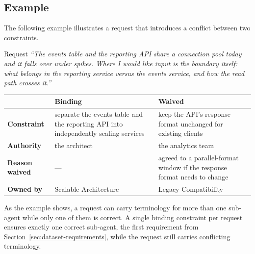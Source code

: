 \clearpage
\subsection{Example}
\label{subsec:constraints-example}

The following example illustrates a request that introduces a conflict between two constraints.

\begin{scenariobox}{Request}
\textit{``The events table and the reporting API share a connection pool today and it falls over under spikes.   Where I would like input is the boundary itself: what belongs in the reporting service versus the events service, and how the read path crosses it.''}
\end{scenariobox}

\begin{table}[H]
    \centering
    \renewcommand{\tabularxcolumn}[1]{m{#1}}
    \begin{tabularx}{\textwidth}{@{}l>{\raggedright\hyphenpenalty=10000\exhyphenpenalty=10000\arraybackslash}X>{\raggedright\hyphenpenalty=10000\exhyphenpenalty=10000\arraybackslash}X@{}}
        \toprule
         & \textcolor{bindingcolor}{\textbf{Binding}} & \textcolor{waivedcolor}{\textbf{Waived}} \\
        \midrule
        \textbf{Constraint} & separate the events table and the reporting API into independently scaling services & keep the API's response format unchanged for existing clients \\ \addlinespace[0.9em]
        \textbf{Authority} & the architect & the analytics team \\ \addlinespace[0.9em]
        \textbf{Reason waived} & --- & agreed to a parallel-format window if the response format needs to change \\ \addlinespace[0.9em]
        \textbf{Owned by} & Scalable Architecture & Legacy Compatibility \\
        \bottomrule
    \end{tabularx}
\end{table}

As the example shows, a request can carry terminology for more than one sub-agent while only one of them is correct. A single binding constraint per request ensures exactly one correct sub-agent, the first requirement from Section~\ref{sec:dataset-requirements}, while the request still carries conflicting terminology.

